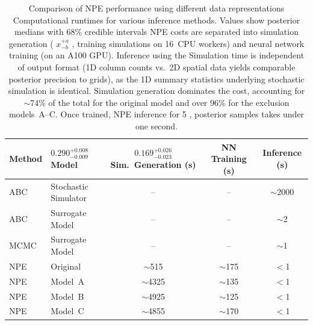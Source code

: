 \documentclass{article}
\providecommand{\DIFaddtex}[1]{{\protect\color{blue} \sf #1}} %
\providecommand{\DIFdeltex}[1]{{\protect\color{red} \scriptsize #1}} %
\providecommand{\DIFaddFL}[1]{\DIFadd{#1}} %
\providecommand{\DIFdelFL}[1]{\DIFdel{#1}} %
\providecommand{\DIFaddbeginFL}{} %
\providecommand{\DIFaddendFL}{} %
\providecommand{\DIFdelbeginFL}{} %
\providecommand{\DIFdelendFL}{} %
\providecommand{\DIFadd}[1]{\texorpdfstring{\DIFaddtex{#1}}{#1}} %
\providecommand{\DIFdel}[1]{\texorpdfstring{\DIFdeltex{#1}}{}} %
\newcommand{\DIFscaledelfig}{0.5}
\newlength{\DIFdelgraphicswidth} %
\newlength{\DIFdelgraphicsheight} %
\newcommand{\DIFaddincludegraphics}[2][]{{\color{blue}\fbox{\DIFOincludegraphics[#1]{#2}}}} %
\newcommand{\DIFdelincludegraphics}[2][]{%
\sbox{\DIFdelgraphicsbox}{\DIFOincludegraphics[#1]{#2}}%
\settoboxwidth{\DIFdelgraphicswidth}{\DIFdelgraphicsbox} %
\settoboxtotalheight{\DIFdelgraphicsheight}{\DIFdelgraphicsbox} %
\scalebox{\DIFscaledelfig}{%
\parbox[b]{\DIFdelgraphicswidth}{\usebox{\DIFdelgraphicsbox}\\[-\baselineskip] \rule{\DIFdelgraphicswidth}{0em}}\llap{\resizebox{\DIFdelgraphicswidth}{\DIFdelgraphicsheight}{%
\setlength{\unitlength}{\DIFdelgraphicswidth}%
\begin{picture}(1,1)%
\thicklines\linethickness{2pt} %
{\color[rgb]{1,0,0}\put(0,0){\framebox(1,1){}}}%
{\color[rgb]{1,0,0}\put(0,0){\line( 1,1){1}}}%
{\color[rgb]{1,0,0}\put(0,1){\line(1,-1){1}}}%
\end{picture}%
}\hspace*{3pt}}} %
} %
\DeclareRobustCommand{\DIFaddbeginFL}{\DIFOaddbeginFL \let\includegraphics\DIFaddincludegraphics} %
\DeclareRobustCommand{\DIFaddendFL}{\DIFOaddendFL \let\includegraphics\DIFOincludegraphics} %
\DeclareRobustCommand{\DIFdelbeginFL}{\DIFOdelbeginFL \let\includegraphics\DIFdelincludegraphics} %
\DeclareRobustCommand{\DIFdelendFL}{\DIFOaddendFL \let\includegraphics\DIFOincludegraphics} %
\begin{document}
\begin{table}[htbp]
	\centering
	\renewcommand{\arraystretch}{1.2} %
	\begin{tabular}{@{}llccc@{}}
		\toprule
		\DIFaddFL{\textbf{Method} }\DIFaddendFL & \DIFdelbeginFL \DIFdelFL{$0.290^{+0.008}_{-0.009}$ }\DIFdelendFL \DIFaddbeginFL \DIFaddFL{\textbf{Model} }\DIFaddendFL & \DIFdelbeginFL \DIFdelFL{$0.169^{+0.026}_{-0.023}$}\DIFdelendFL \DIFaddbeginFL \DIFaddFL{\textbf{Sim.\ Generation (s)} }& \DIFaddFL{\textbf{NN Training (s)} }& \DIFaddFL{\textbf{Inference (s)} }\DIFaddendFL \\
		\DIFaddbeginFL \midrule
		\DIFaddFL{ABC }& \DIFaddFL{Stochastic Simulator }& \DIFaddFL{-- }& \DIFaddFL{-- }& \DIFaddFL{$\sim$2000 }\\
		\DIFaddFL{ABC }& \DIFaddFL{Surrogate Model }& \DIFaddFL{-- }& \DIFaddFL{-- }& \DIFaddFL{$\sim$2 }\\
		\DIFaddFL{MCMC }& \DIFaddFL{Surrogate Model }& \DIFaddFL{-- }& \DIFaddFL{-- }& \DIFaddFL{$\sim$1 }\\
		\midrule
		\DIFaddFL{NPE }& \DIFaddFL{Original }& \DIFaddFL{$\sim$515 }& \DIFaddFL{$\sim$175 }& \DIFaddFL{$<$1 }\\
		\DIFaddFL{NPE }& \DIFaddFL{Model~A }& \DIFaddFL{$\sim$4325 }& \DIFaddFL{$\sim$135 }& \DIFaddFL{$<$1 }\\
		\DIFaddFL{NPE }& \DIFaddFL{Model~B }& \DIFaddFL{$\sim$4925 }& \DIFaddFL{$\sim$125 }& \DIFaddFL{$<$1 }\\
		\DIFaddFL{NPE }& \DIFaddFL{Model~C }& \DIFaddFL{$\sim$4855 }& \DIFaddFL{$\sim$170 }& \DIFaddFL{$<$1 }\\
		\DIFaddendFL \bottomrule
	\end{tabular}
		\caption{\DIFdelbeginFL \DIFdelFL{Comparison of NPE performance using different data representations}\DIFdelendFL \DIFaddbeginFL \DIFaddFL{Computational runtimes for various inference methods}\DIFaddendFL . \DIFdelbeginFL \DIFdelFL{Values show posterior medians with 68\% credible intervals }\DIFdelendFL \DIFaddbeginFL \DIFaddFL{NPE costs are separated into simulation generation }\DIFaddendFL (\DIFdelbeginFL \DIFdelFL{$x^{+a}_{-b}$}\DIFdelendFL \DIFaddbeginFL \DIFaddFL{50}{\DIFaddFL{,}}\DIFaddFL{000 training simulations on 16~CPU workers}\DIFaddendFL ) \DIFaddbeginFL \DIFaddFL{and neural network training (on an A100 GPU)}\DIFaddendFL . \DIFdelbeginFL \DIFdelFL{Inference using the }\DIFdelendFL \DIFaddbeginFL \DIFaddFL{Simulation time is independent of output format (1D column counts vs.\ }\DIFaddendFL 2D spatial \DIFdelbeginFL \DIFdelFL{data yields comparable posterior precision to }\DIFdelendFL \DIFaddbeginFL \DIFaddFL{grids), as }\DIFaddendFL the \DIFdelbeginFL \DIFdelFL{1D summary statistics}\DIFdelendFL \DIFaddbeginFL \DIFaddFL{underlying stochastic simulation is identical}\DIFaddendFL . \DIFaddbeginFL \DIFaddFL{Simulation generation dominates the cost, accounting for $\sim$74\% of the total for the original model and over 96\% for the exclusion models~A--C. Once trained, NPE inference for 5}{\DIFaddFL{,}}\DIFaddFL{000 posterior samples takes under one second.}\DIFaddendFL }	\DIFdelbeginFL %

\end{table}
\end{document}
